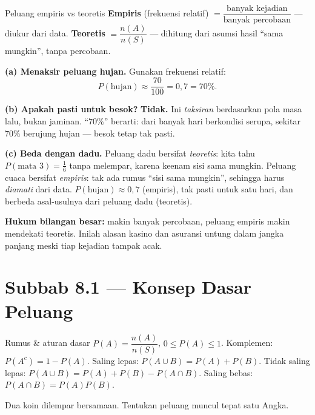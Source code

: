 \begin{ingat}{Peluang empiris vs teoretis}
\textbf{Empiris} (frekuensi relatif) $=\dfrac{\text{banyak kejadian}}{\text{banyak
percobaan}}$ --- diukur dari data. \textbf{Teoretis} $=\dfrac{n(A)}{n(S)}$ ---
dihitung dari asumsi hasil ``sama mungkin'', tanpa percobaan.
\end{ingat}

\textbf{(a) Menaksir peluang hujan.} Gunakan frekuensi relatif:
\[
P(\text{hujan})\approx\frac{70}{100}=0{,}7=70\%.
\]

\textbf{(b) Apakah pasti untuk besok?} \textbf{Tidak.} Ini \emph{taksiran}
berdasarkan pola masa lalu, bukan jaminan. ``$70\%$'' berarti: dari banyak hari
berkondisi serupa, sekitar $70\%$ berujung hujan --- besok tetap tak pasti.

\textbf{(c) Beda dengan dadu.} Peluang dadu bersifat \emph{teoretis}: kita tahu
$P(\text{mata }3)=\frac16$ tanpa melempar, karena keenam sisi sama mungkin.
Peluang cuaca bersifat \emph{empiris}: tak ada rumus ``sisi sama mungkin'',
sehingga harus \emph{diamati} dari data.
\jadi $P(\text{hujan})\approx0{,}7$ (empiris), tak pasti untuk satu hari, dan
berbeda asal-usulnya dari peluang dadu (teoretis).

\begin{tips}
\textbf{Hukum bilangan besar:} makin banyak percobaan, peluang empiris makin
mendekati teoretis. Inilah alasan kasino dan asuransi untung dalam jangka panjang
meski tiap kejadian tampak acak.
\end{tips}

\section*{Subbab 8.1 — Konsep Dasar Peluang}

\begin{ingat}{Rumus \& aturan dasar}
$P(A)=\dfrac{n(A)}{n(S)}$, $0\le P(A)\le1$. Komplemen: $P(A^c)=1-P(A)$.
Saling lepas: $P(A\cup B)=P(A)+P(B)$. Tidak saling lepas:
$P(A\cup B)=P(A)+P(B)-P(A\cap B)$. Saling bebas: $P(A\cap B)=P(A)P(B)$.
\end{ingat}

\begin{soalbox}{}
Dua koin dilempar bersamaan. Tentukan peluang muncul tepat satu Angka.
\end{soalbox}

